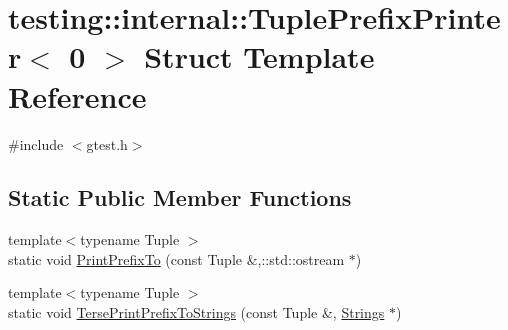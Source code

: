 \hypertarget{structtesting_1_1internal_1_1_tuple_prefix_printer_3_010_01_4}{\section{testing\-:\-:internal\-:\-:Tuple\-Prefix\-Printer$<$ 0 $>$ Struct Template Reference}
\label{structtesting_1_1internal_1_1_tuple_prefix_printer_3_010_01_4}
}


{\ttfamily \#include $<$gtest.\-h$>$}

\subsection*{Static Public Member Functions}
\begin{DoxyCompactItemize}
\item 
{\footnotesize template$<$typename Tuple $>$ }\\static void \hyperlink{structtesting_1_1internal_1_1_tuple_prefix_printer_3_010_01_4_a80ebc4ff2edc7e7626fe7354e109dca2}{Print\-Prefix\-To} (const Tuple \&,\-::std\-::ostream $\ast$)
\item 
{\footnotesize template$<$typename Tuple $>$ }\\static void \hyperlink{structtesting_1_1internal_1_1_tuple_prefix_printer_3_010_01_4_a634e1811ae45ef3f02e3559a5c28e999}{Terse\-Print\-Prefix\-To\-Strings} (const Tuple \&, \hyperlink{namespacetesting_1_1internal_a7706b17f05f4b49e351b052ae4e05073}{Strings} $\ast$)
\end{DoxyCompactItemize}


